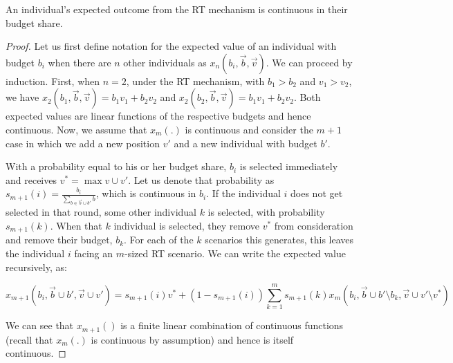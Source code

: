 
\begin{proposition}
An individual's expected outcome from the RT mechanism is continuous
in their budget share.
\end{proposition}
\begin{proof} 
  
  Let us first define notation for the expected value of an individual
  with budget $b_i$ when there are $n$ other individuals as $x_n(b_i,
  \vec{b}, \vec{v})$. We can proceed by induction. First, when $n=2$,
  under the RT mechanism, with $b_1 > b_2$ and $v_1 > v_2$, we have
  $x_2(b_1, \vec{b}, \vec{v}) = b_1v_1 + b_2v_2$ and $x_2(b_2,
  \vec{b}, \vec{v}) = b_1v_1 + b_2v_2$. Both expected values are
  linear functions of the respective budgets and hence
  continuous. Now, we assume that $x_m(.)$ is continuous and consider
  the $m+1$ case in which we add a new position $v'$ and a new
  individual with budget $b'$.

With a probability equal to his or her budget share, $b_i$ is selected
immediately and receives $v^* = \max v \cup v'$. Let us denote that
probability as $s_{m+1}(i) = \frac{b_i}{\sum_{b \in \vec{b} \cup b'}
  b}$, which is continuous in $b_i$. If the individual $i$ does not
get selected in that round, some other individual $k$ is selected,
with probability $s_{m+1}(k)$. When that $k$ individual is selected,
they remove $v^*$ from consideration and remove their budget,
$b_k$. For each of the $k$ scenarios this generates, this leaves the
individual $i$ facing an $m$-sized RT scenario. We can write the
expected value recursively, as:


\begin{equation*} 
x_{m+1}(b_i, \vec{b} \cup b', \vec{v} \cup v') = 
s_{m+1}(i) v^* + 
\left(1- s_{m+1}(i) \right) 
\sum_{k=1}^{m} s_{m+1}(k) x_m (b_i, \vec{b} \cup b' \setminus b_k, \vec{v} \cup v' \setminus v^*) 
\end{equation*}


We can see that $x_{m+1}()$ is a finite linear combination of
continuous functions (recall that $x_{m}(.)$ is continuous by
assumption) and hence is itself continuous.
\end{proof} 

